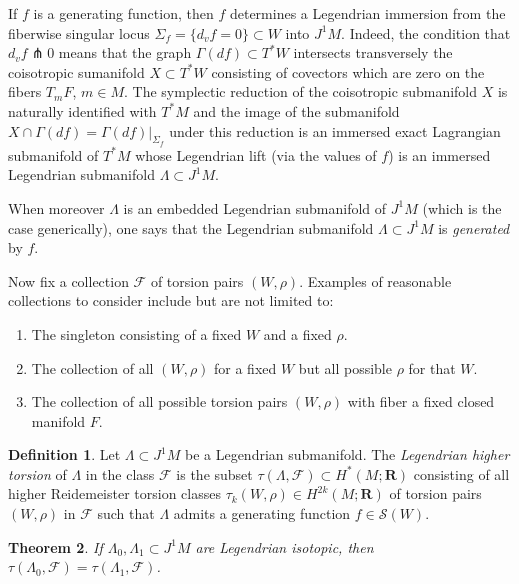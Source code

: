 \documentclass{amsart}
\newcommand\cF{\mathcal{F}}
\def\bR{\mathbf{R}}
\newtheorem{theorem}{Theorem}[section]
\theoremstyle{definition}
\newtheorem{definition}[theorem]{Definition}
\theoremstyle{remark}
\newtheorem{inductive lemma}[theorem]{Inductive Lemma}
\begin{document}
If $f$ is a generating function, then $f$ determines a Legendrian immersion from the fiberwise singular locus $\Sigma_f = \{ d_v f = 0 \} \subset W$ into $J^1M$. Indeed, the condition that $d_v f \pitchfork 0$ means that the graph $\Gamma(df) \subset T^*W$ intersects transversely the coisotropic sumanifold $X \subset T^*W$ consisting of covectors which are zero on the fibers $T_mF$, $m \in M$. The symplectic reduction of the coisotropic submanifold $X$ is naturally identified with $T^*M$ and the image of the submanifold $X \cap \Gamma(df) =\Gamma(df)|_{\Sigma_f}$ under this reduction is an immersed exact Lagrangian submanifold of $T^*M$ whose Legendrian lift (via the values of $f$) is an immersed Legendrian submanifold $\Lambda \subset J^1M$.  

When moreover $\Lambda$ is an embedded Legendrian submanifold of $J^1M$ (which is the case generically), one says that the Legendrian submanifold  $\Lambda \subset J^1M$ is {\em generated} by $f$. %

Now fix a collection $\cF$ of torsion pairs $(W,\rho)$. Examples of reasonable collections to consider include but are not limited to:
\begin{enumerate}
\item The singleton consisting of a fixed $W$ and a fixed $\rho$.
\item The collection of all $(W,\rho)$ for a fixed $W$ but all possible $\rho$ for that $W$. 
\item The collection of all possible torsion pairs $(W,\rho)$ with fiber a fixed closed manifold $F$.
\end{enumerate}

\begin{definition}  Let  $\Lambda \subset J^1M$ be a Legendrian submanifold. The {\em{Legendrian higher torsion}} of $\Lambda$ in the class $\cF$ is the subset $\tau(\Lambda,\cF) \subset H^*(M;\bR)$ consisting of all higher Reidemeister torsion classes $\tau_k(W,\rho) \in H^{2k}(M;\bR)$ of torsion pairs $(W,\rho)$ in $\cF$ such that $\Lambda$ admits a generating function $f \in \mathcal{S}(W)$.
\end{definition}

\begin{theorem}
If $\Lambda_0,\Lambda_1 \subset J^1M$ are Legendrian isotopic, then $\tau(\Lambda_0,\cF)=\tau(\Lambda_1,\cF)$. 
\end{theorem}
\end{document}
